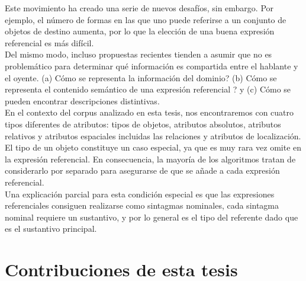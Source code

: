 Este movimiento ha creado una serie de nuevos desaf\'ios, sin embargo. Por ejemplo, el
n\'umero de formas en las que uno puede referirse a un conjunto de objetos de destino aumenta, por lo que la elecci\'on de una
buena expresi\'on referencial es m\'as dif\'icil.\\

Del mismo modo, incluso propuestas recientes tienden a asumir que no es problem\'atico para determinar qu\'e informaci\'on
es compartida entre el hablante y el oyente.
 (a) C\'omo se representa la informaci\'on del dominio?
(b) C\'omo se representa el contenido sem\'antico de una expresi\'on referencial ? y (c) C\'omo se pueden encontrar descripciones distintivas.\\

 En el contexto del corpus analizado en esta tesis, nos encontraremos con cuatro tipos diferentes de atributos:
tipos de objetos, atributos absolutos, atributos relativos y atributos espaciales incluidas las relaciones y atributos de localizaci\'on.\\

El tipo de un objeto constituye un caso especial, ya que es muy rara vez omite
en la expresi\'on referencial. En consecuencia, la mayor\'ia de los algoritmos tratan de
considerarlo por separado para asegurarse de que se a\~nade a cada expresi\'on referencial. \\

Una explicaci\'on parcial para esta condici\'on especial es que las expresiones referenciales consiguen realizarse como sintagmas nominales,
cada sintagma nominal requiere un sustantivo, y por lo general es el tipo del referente dado que es el sustantivo principal.\\

\section{Contribuciones de esta tesis}
\label{sec:contribiciones}

